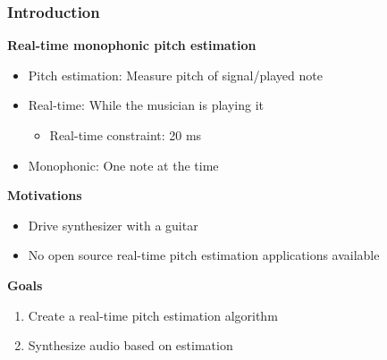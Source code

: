 \documentclass[table]{beamer}
\begin{document}
\begin{frame}
\frametitle{Introduction}
    {\large \textbf{Real-time monophonic pitch estimation}}
    \begin{itemize}
        \item Pitch estimation: Measure pitch of signal/played note
        \item Real-time: While the musician is playing it
        \begin{itemize}
            \item[{\LARGE \rotatebox[origin=c]{180}{$\Lsh$}}] Real-time constraint: 20 ms
        \end{itemize}
        \item Monophonic: One note at the time
    \end{itemize}
    \vfill

    {\large \textbf{Motivations}}
    \begin{itemize}
        \item Drive synthesizer with a guitar
        \item No open source real-time pitch estimation applications available
    \end{itemize}
    \vfill

    {\large \textbf{Goals}}
    \begin{enumerate}
        \item Create a real-time pitch estimation algorithm
        \item Synthesize audio based on estimation
    \end{enumerate}

\end{frame}
\end{document}
